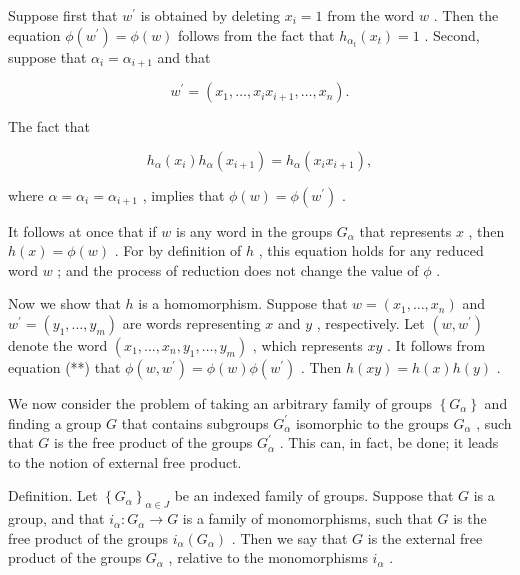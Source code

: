 \documentclass[10pt]{article}
\begin{document}
Suppose first that \({w}^{\prime }\) is obtained by deleting \({x}_{i} = 1\) from the word \(w\) . Then the equation \(\phi \left( {w}^{\prime }\right)  = \phi \left( w\right)\) follows from the fact that \({h}_{{\alpha }_{t}}\left( {x}_{t}\right)  = 1\) . Second, suppose that \({\alpha }_{i} = {\alpha }_{i + 1}\) and that

\[
{w}^{\prime } = \left( {{x}_{1},\ldots ,{x}_{i}{x}_{i + 1},\ldots ,{x}_{n}}\right) .
\]

The fact that

\[
{h}_{\alpha }\left( {x}_{i}\right) {h}_{\alpha }\left( {x}_{i + 1}\right)  = {h}_{\alpha }\left( {{x}_{i}{x}_{i + 1}}\right) ,
\]

where \(\alpha  = {\alpha }_{i} = {\alpha }_{i + 1}\) , implies that \(\phi \left( w\right)  = \phi \left( {w}^{\prime }\right)\) .

It follows at once that if \(w\) is any word in the groups \({G}_{\alpha }\) that represents \(x\) , then \(h\left( x\right)  = \phi \left( w\right)\) . For by definition of \(h\) , this equation holds for any reduced word \(w\) ; and the process of reduction does not change the value of \(\phi\) .

Now we show that \(h\) is a homomorphism. Suppose that \(w = \left( {{x}_{1},\ldots ,{x}_{n}}\right)\) and \({w}^{\prime } = \left( {{y}_{1},\ldots ,{y}_{m}}\right)\) are words representing \(x\) and \(y\) , respectively. Let \(\left( {w,{w}^{\prime }}\right)\) denote the word \(\left( {{x}_{1},\ldots ,{x}_{n},{y}_{1},\ldots ,{y}_{m}}\right)\) , which represents \({xy}\) . It follows from equation (**) that \(\phi \left( {w,{w}^{\prime }}\right)  = \phi \left( w\right) \phi \left( {w}^{\prime }\right)\) . Then \(h\left( {xy}\right)  = h\left( x\right) h\left( y\right)\) .

We now consider the problem of taking an arbitrary family of groups \(\left\{  {G}_{\alpha }\right\}\) and finding a group \(G\) that contains subgroups \({G}_{\alpha }^{\prime }\) isomorphic to the groups \({G}_{\alpha }\) , such that \(G\) is the free product of the groups \({G}_{\alpha }^{\prime }\) . This can, in fact, be done; it leads to the notion of external free product.

Definition. Let \({\left\{  {G}_{\alpha }\right\}  }_{\alpha  \in  J}\) be an indexed family of groups. Suppose that \(G\) is a group, and that \({i}_{\alpha } : {G}_{\alpha } \rightarrow  G\) is a family of monomorphisms, such that \(G\) is the free product of the groups \({i}_{\alpha }\left( {G}_{\alpha }\right)\) . Then we say that \(G\) is the external free product of the groups \({G}_{\alpha }\) , relative to the monomorphisms \({i}_{\alpha }\) .
\end{document}
